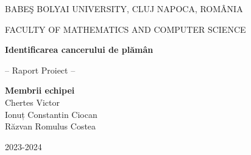 \documentclass[runningheads,a4paper,11pt]{report}
\begin{document}
\begin{titlepage}
\sloppy

\begin{center}
BABE\c S BOLYAI UNIVERSITY, CLUJ NAPOCA, ROM\^ ANIA

FACULTY OF MATHEMATICS AND COMPUTER SCIENCE

\vspace{6cm}

\Huge \textbf{Identificarea cancerului de plămân}

\vspace{1cm}

\normalsize -- Raport Proiect --

\end{center}

\vspace{5cm}

\begin{flushright}
\Large{\textbf{Membrii echipei}}\\
Chertes Victor\\
Ionuț Constantin Ciocan\\
Răzvan Romulus Costea
\end{flushright}

\vspace{4cm}

\begin{center}
2023-2024
\end{center}

\end{titlepage}


\begin{abstract}
	Dezvoltarea unui sistem inteligent care să ajute medicii în diagnosticarea timpurie a cancerului de plămân. Deși cancerul pulmonar este recunoscut ca fiind cel mai mortal tip de cancer, un prognostic bun și un tratament eficient depind de detectarea timpurie a acestuia. Acest proiect urmărește dezvoltarea unor modele inteligente capabile să analizeze scanările CT și să prezică diferiți biomarkeri tumorali, construind o "biopsie virtuală" care să sprijine radiologii.
\end{abstract}


\tableofcontents

\newpage

\listoftables
\listoffigures
\listofalgorithms

\newpage

\end{document}
